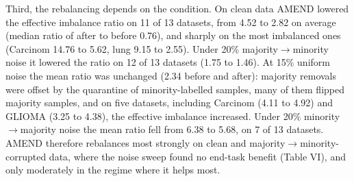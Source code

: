 \documentclass[conference]{IEEEtran}
\begin{document}
Third, the rebalancing depends on the condition. On clean data AMEND lowered the effective imbalance ratio on 11 of 13 datasets, from 4.52 to 2.82 on average (median ratio of after to before 0.76), and sharply on the most imbalanced ones (Carcinom 14.76 to 5.62, lung 9.15 to 2.55). Under 20\% majority$\rightarrow $minority noise it lowered the ratio on 12 of 13 datasets (1.75 to 1.46). At 15\% uniform noise the mean ratio was unchanged (2.34 before and after): majority removals were offset by the quarantine of minority-labelled samples, many of them flipped majority samples, and on five datasets, including Carcinom (4.11 to 4.92) and GLIOMA (3.25 to 4.38), the effective imbalance increased. Under 20\% minority$\rightarrow $majority noise the mean ratio fell from 6.38 to 5.68, on 7 of 13 datasets. AMEND therefore rebalances most strongly on clean and majority$\rightarrow $minority-corrupted data, where the noise sweep found no end-task benefit (Table VI), and only moderately in the regime where it helps most.
\end{document}
